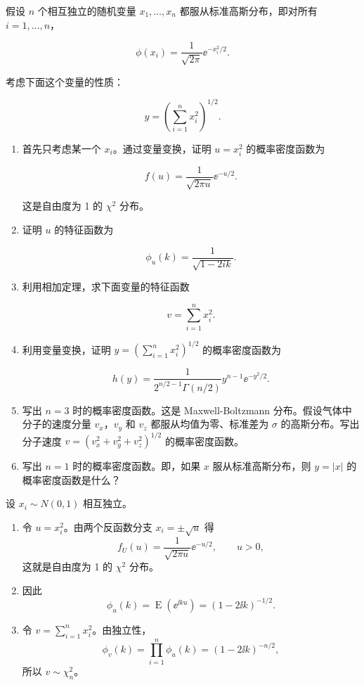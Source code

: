 \begin{question}
假设 \(n\) 个相互独立的随机变量 \(x_1,\ldots,x_n\)
都服从标准高斯分布，即对所有 \(i=1,\ldots,n\)，

\[
\phi(x_i)=\frac{1}{\sqrt{2\pi}}\ee^{-x_i^2/2}.
\]

考虑下面这个变量的性质：

\[
y=\left(\sum_{i=1}^{n}x_i^2\right)^{1/2}.
\]

\begin{enumerate}
\item 首先只考虑某一个 \(x_i\)。通过变量变换，证明 \(u=x_i^2\)
的概率密度函数为

\[
f(u)=\frac{1}{\sqrt{2\pi u}}\ee^{-u/2}.
\]

这是自由度为 1 的 \(\chi^2\) 分布。

\item 证明 \(u\) 的特征函数为

\[
\phi_u(k)=\frac{1}{\sqrt{1-2ik}}.
\]

\item 利用相加定理，求下面变量的特征函数

\[
v=\sum_{i=1}^{n}x_i^2.
\]

\item 利用变量变换，证明 \(y=\left(\sum_{i=1}^{n}x_i^2\right)^{1/2}\)
的概率密度函数为

\[
h(y)=\frac{1}{2^{n/2-1}\Gamma(n/2)}y^{n-1}\ee^{-y^2/2}.
\]

\item 写出 \(n=3\) 时的概率密度函数。这是 Maxwell-Boltzmann
分布。假设气体中分子的速度分量 \(v_x\)，\(v_y\) 和 \(v_z\)
都服从均值为零、标准差为 \(\sigma\) 的高斯分布。写出分子速度
\(v=(v_x^2+v_y^2+v_z^2)^{1/2}\) 的概率密度函数。

\item 写出 \(n=1\) 时的概率密度函数。即，如果 \(x\) 服从标准高斯分布，则
\(y=|x|\) 的概率密度函数是什么？
\end{enumerate}
\begin{solution}
设 \(x_i\sim N(0,1)\) 相互独立。

\begin{enumerate}
\item 令 \(u=x_i^2\)。由两个反函数分支 \(x_i=\pm\sqrt u\) 得
\[
f_U(u)=\frac{1}{\sqrt{2\pi u}}\ee^{-u/2},\qquad u>0,
\]
这就是自由度为 1 的 \(\chi^2\) 分布。

\item 因此
\[
\phi_u(k)=\operatorname{E}(\ee^{\ii ku})=(1-2\ii k)^{-1/2}.
\]

\item 令 \(v=\sum_{i=1}^n x_i^2\)。由独立性，
\[
\phi_v(k)=\prod_{i=1}^n\phi_u(k)=(1-2\ii k)^{-n/2},
\]
所以 \(v\sim\chi_n^2\)。


\end{enumerate}
\end{solution}
\end{question}
